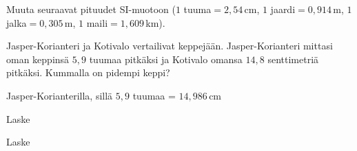 \begin{tehtavasivu}

\begin{tehtava}
Muuta seuraavat pituudet SI-muotoon ($1$ tuuma$= 2,54$\,cm, $1$ jaardi$=0,914$\,m, $1$ jalka$= 0,305$\,m, $1$ maili$ = 1,609$\,km).
\begin{vastaus}
\end{vastaus}
\end{tehtava}

\begin{tehtava}
Jasper-Korianteri ja Kotivalo vertailivat keppejään. Jasper-Korianteri mittasi oman keppinsä $5,9$ tuumaa pitkäksi ja Kotivalo omansa $14,8$ senttimetriä pitkäksi. Kummalla on pidempi keppi?
\begin{vastaus}
Jasper-Korianterilla, sillä $5,9$ tuumaa = $14,986$\,cm
\end{vastaus}
\end{tehtava}

\begin{tehtava}
Laske
\begin{vastaus}
\end{vastaus}
\end{tehtava}

\begin{tehtava}
Laske
\begin{vastaus}
\end{vastaus}
\end{tehtava}


\end{tehtavasivu}
